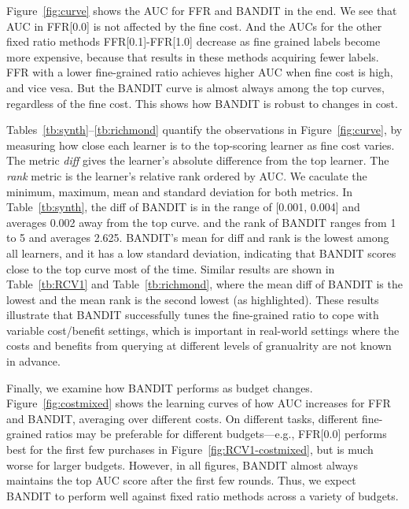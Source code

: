 Figure~\ref{fig:curve} shows the AUC for FFR and BANDIT in the end. We see that AUC in 
FFR[0.0] is not affected by the fine cost. And the AUCs for the other fixed ratio methods
FFR[0.1]-FFR[1.0] decrease as fine grained labels become more expensive, because that results in these methods 
acquiring fewer labels.
FFR with a lower fine-grained ratio achieves higher AUC when fine cost is high, and vice vesa. But the BANDIT curve is almost
always among the top curves, regardless of the fine cost. This shows how BANDIT is robust to changes in cost.

Tables~\ref{tb:synth}--\ref{tb:richmond} quantify
the observations in Figure~\ref{fig:curve}, by measuring
how close each learner is to the top-scoring learner as fine cost varies. 
The metric {\em diff} gives the learner's absolute difference from the top learner. The {\em rank} metric is
the learner's relative rank ordered by AUC.  We caculate the minimum, maximum, mean and standard deviation
for both metrics. In Table~\ref{tb:synth}, the diff of BANDIT is in the range of [0.001, 0.004] and averages
0.002 away from the top curve. and the rank of BANDIT ranges from 1 to 5 and averages 2.625.
BANDIT's mean for diff and rank is the lowest among all learners, and it has a low standard deviation, indicating
that BANDIT scores close to the top curve most of the time. 
Similar results are shown in Table~\ref{tb:RCV1} and Table~\ref{tb:richmond}, where the mean
diff of BANDIT is the lowest and the mean rank is the second lowest (as highlighted). These results illustrate
that BANDIT successfully tunes the fine-grained ratio  to cope with variable cost/benefit settings,
which is important in real-world settings where the costs and benefits from querying at different levels of granualrity
are not known in advance.

Finally, we examine how BANDIT performs as budget changes. Figure~\ref{fig:costmixed} shows the learning curves
of how AUC increases for FFR and BANDIT, averaging over different costs. On different tasks, different fine-grained
ratios may be preferable for different budgets---e.g., FFR[0.0] performs best for the first few purchases in Figure~\ref{fig:RCV1-costmixed}, but
is much worse for larger budgets.  However, in all figures, BANDIT almost always maintains the top AUC score
after the first few rounds. Thus, we expect BANDIT to perform well against fixed ratio methods across a variety of budgets.

